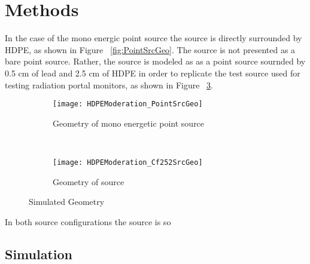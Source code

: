 \section{Methods}

In the case of the mono energic point source the source is directly surrounded by HDPE, as shown in Figure ~\ref{fig:PointSrcGeo}. 
The  source is not presented as a bare point source.
Rather, the source is modeled as as a point  source sournded by 0.5 cm of lead and 2.5 cm of HDPE in order to replicate the test source used for testing radiation portal monitors, as shown in Figure ~\ref{fig:Cf252SrcGeo}.
\begin{figure}
  \centering
  \begin{subfigure}[b]{0.45\textwidth}
    \centering
    \texttt{[image: HDPEModeration\_PointSrcGeo]}
    \caption{Geometry of mono energetic point source}
    \label{fig:Cf252SrcGeo}
  \end{subfigure}%
  ~
  \begin{subfigure}[b]{0.45\textwidth}
    \centering
    \texttt{[image: HDPEModeration\_Cf252SrcGeo]}
    \caption{Geometry of  source}
    \label{fig:Cf252SrcGeo}
  \end{subfigure}
  \caption{Simulated Geometry}
\end{figure}
In both source configurations the source is so

\subsection{Simulation}
%
